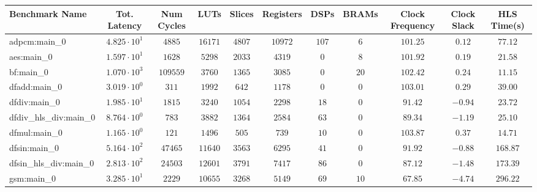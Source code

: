 \begin{tabular}{|l|c|c|c|c|c|c|c|c|c|c|}
\hline
Benchmark Name          & Tot. Latency           & Num Cycles & LUTs       & Slices    & Registers & DSPs    & BRAMs   & Clock Frequency & Clock Slack & HLS Time(s) \\
\hline
adpcm:main\_0           & $ 4.825 \cdot 10^{1} $ & $ 4885   $ & $ 16171  $ & $ 4807  $ & $ 10972 $ & $ 107 $ & $ 6   $ & $ 101.25      $ & $ 0.12    $ & $ 77.12   $ \\
aes:main\_0             & $ 1.597 \cdot 10^{1} $ & $ 1628   $ & $ 5298   $ & $ 2033  $ & $ 4319  $ & $ 0   $ & $ 8   $ & $ 101.92      $ & $ 0.19    $ & $ 21.58   $ \\
bf:main\_0              & $ 1.070 \cdot 10^{3} $ & $ 109559 $ & $ 3760   $ & $ 1365  $ & $ 3085  $ & $ 0   $ & $ 20  $ & $ 102.42      $ & $ 0.24    $ & $ 11.15   $ \\
dfadd:main\_0           & $ 3.019 \cdot 10^{0} $ & $ 311    $ & $ 1992   $ & $ 642   $ & $ 1178  $ & $ 0   $ & $ 0   $ & $ 103.01      $ & $ 0.29    $ & $ 39.00   $ \\
dfdiv:main\_0           & $ 1.985 \cdot 10^{1} $ & $ 1815   $ & $ 3240   $ & $ 1054  $ & $ 2298  $ & $ 18  $ & $ 0   $ & $ 91.42       $ & $ -0.94   $ & $ 23.72   $ \\
dfdiv\_hls\_div:main\_0 & $ 8.764 \cdot 10^{0} $ & $ 783    $ & $ 3882   $ & $ 1364  $ & $ 2584  $ & $ 63  $ & $ 0   $ & $ 89.34       $ & $ -1.19   $ & $ 25.10   $ \\
dfmul:main\_0           & $ 1.165 \cdot 10^{0} $ & $ 121    $ & $ 1496   $ & $ 505   $ & $ 739   $ & $ 10  $ & $ 0   $ & $ 103.87      $ & $ 0.37    $ & $ 14.71   $ \\
dfsin:main\_0           & $ 5.164 \cdot 10^{2} $ & $ 47465  $ & $ 11640  $ & $ 3563  $ & $ 6295  $ & $ 41  $ & $ 0   $ & $ 91.92       $ & $ -0.88   $ & $ 168.87  $ \\
dfsin\_hls\_div:main\_0 & $ 2.813 \cdot 10^{2} $ & $ 24503  $ & $ 12601  $ & $ 3791  $ & $ 7417  $ & $ 86  $ & $ 0   $ & $ 87.12       $ & $ -1.48   $ & $ 173.39  $ \\
gsm:main\_0             & $ 3.285 \cdot 10^{1} $ & $ 2229   $ & $ 10655  $ & $ 3268  $ & $ 5149  $ & $ 69  $ & $ 10  $ & $ 67.85       $ & $ -4.74   $ & $ 296.22  $ \\

\end{tabular}
